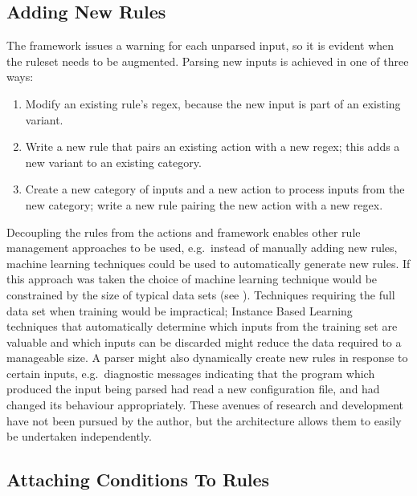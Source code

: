 \subsection{Adding New Rules}

The framework issues a warning for each unparsed input, so it is evident
when the ruleset needs to be augmented.  Parsing new inputs is achieved in
one of three ways:

\begin{enumerate}

    \item Modify an existing rule's regex, because the new input is part of
        an existing variant.

    \item Write a new rule that pairs an existing action with a new regex;
        this adds a new variant to an existing category.

    \item Create a new category of inputs and a new action to process
        inputs from the new category; write a new rule pairing the new
        action with a new regex.

\end{enumerate}

Decoupling the rules from the actions and framework enables other rule
management approaches to be used, e.g.\ instead of manually adding new
rules, machine learning techniques could be used to automatically generate
new rules.  If this approach was taken the choice of machine learning
technique would be constrained by the size of typical data sets (see
).  Techniques requiring the full data set
when training would be impractical; Instance Based
Learning~\cite{instance-based-learning} techniques that automatically
determine which inputs from the training set are valuable and which inputs
can be discarded might reduce the data required to a manageable size.  A
parser might also dynamically create new rules in response to certain
inputs, e.g.\ diagnostic messages indicating that the program which
produced the input being parsed had read a new configuration file, and had
changed its behaviour appropriately.  These avenues of research and
development have not been pursued by the author, but the architecture
allows them to easily be undertaken independently.

\subsection{Attaching Conditions To Rules}

